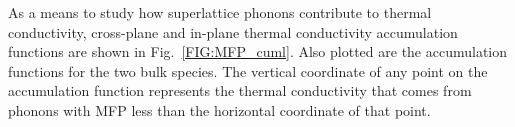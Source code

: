 \documentclass[aps,prb,preprint,preprintnumbers,amsmath,amssymb,floatfix,superscriptaddress]{revtex4}
\newcommand{\kv}{\mspace{-4.0mu}\left(\mspace{-8.0mu}
\begin{smallmatrix}&\pmb{\kappa} \\&\nu\end{smallmatrix}
\mspace{-3.0mu}\right)}
\begin{document}
As a means to study how superlattice phonons contribute to thermal conductivity, cross-plane and in-plane thermal conductivity accumulation functions are shown in Fig.~\ref{FIG:MFP_cuml}. Also plotted are the accumulation functions for the two bulk species. The vertical coordinate of any point on the accumulation function represents the thermal conductivity that comes from phonons with MFP less than the horizontal coordinate of that point.

\begin{comment}
The plots of the CP thermal conductivity MFP contribution curves, defined by
\begin{equation}\label{EQ:MFP_contr}
\begin{split}
dk_{\alpha}(\Lambda \kv)=c_{ph}\kv v^2_{g,\alpha}\kv \frac{\Lambda \kv} {|\pmb{\mathrm{v}}_{g}\kv|} d\Lambda \kv, 
\end{split}
\end{equation}
is shown in Fig.~\ref{FIG:MFP_cp}. 
\begin{figure}%
\begin{center}
\scalebox{1}{ \texttt{[image: MFP\_cp.eps]}}
\renewcommand{\figure}{Fig.}
\caption{Phonon mean free path normalized by the period length contribution to the cross-plane thermal conductivity. Color corresponds to those used in Fig.~\ref{FIG:lifetime}. Average MFP is reported. Orange corresponds to lighter bulk and green corresponds to heavier bulk.}
\label{FIG:MFP_cp}
\end{center}
\end{figure}
There is a clear reduction in the contribution to cross-plane thermal conductivity in perfect superlattices from modes with a MFP greater than the period length as period length increases. This trend is consistent with the theoretical predictions from Mahan that a minimum thermal conductivity occurs as the transport behaviour shifts from a wave-regime to particle-regime when the average MFP transitions from being greater than the period length to being less than the period length.\cite{PhysRevLett.84.927,PhysRevB.56.10754} This same trend is observed in the contribution curves for the in-plane conductivity (not shown). The minimum cross-plane thermal conductivity for perfect superlattices occurs at a point where the average MFP is greater than the period length ($4 \times 4$), as described by Mahan.\cite{PhysRevLett.84.927} 
\end{comment}
\end{document}
